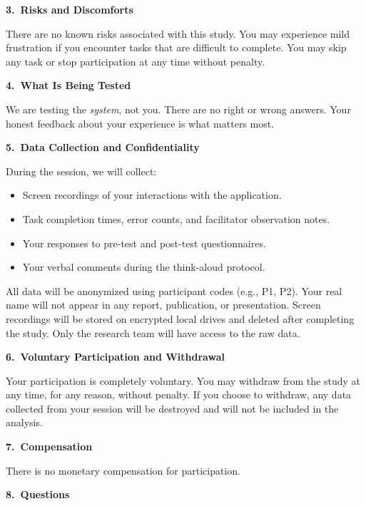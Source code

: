 \documentclass[12pt, titlepage]{article}
\begin{document}
\bigskip

\noindent\textbf{3.\ Risks and Discomforts}

There are no known risks associated with this study. You may experience mild frustration if you encounter tasks that are difficult to complete. You may skip any task or stop participation at any time without penalty.

\bigskip

\noindent\textbf{4.\ What Is Being Tested}

We are testing the \emph{system}, not you. There are no right or wrong answers. Your honest feedback about your experience is what matters most.

\bigskip

\noindent\textbf{5.\ Data Collection and Confidentiality}

During the session, we will collect:
\begin{itemize}
  \item Screen recordings of your interactions with the application.
  \item Task completion times, error counts, and facilitator observation notes.
  \item Your responses to pre-test and post-test questionnaires.
  \item Your verbal comments during the think-aloud protocol.
\end{itemize}

All data will be anonymized using participant codes (e.g., P1, P2). Your real name will not appear in any report, publication, or presentation. Screen recordings will be stored on encrypted local drives and deleted after completing the study. Only the research team will have access to the raw data.

\bigskip

\noindent\textbf{6.\ Voluntary Participation and Withdrawal}

Your participation is completely voluntary. You may withdraw from the study at any time, for any reason, without penalty. If you choose to withdraw, any data collected from your session will be destroyed and will not be included in the analysis.

\bigskip

\noindent\textbf{7.\ Compensation}

There is no monetary compensation for participation. 

\bigskip

\noindent\textbf{8.\ Questions}
\end{document}

